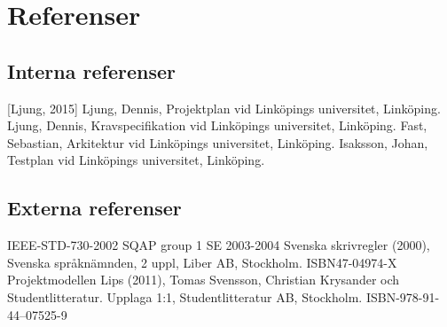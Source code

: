 \section{Referenser}


\subsection{Interna referenser}
[Ljung, 2015] Ljung, Dennis, Projektplan vid Linköpings universitet, Linköping.
\newline
\newline
[Ljung, 2015] Ljung, Dennis, Kravspecifikation vid Linköpings universitet, Linköping.
\newline
\newline
[Fast, 2015] Fast, Sebastian, Arkitektur vid Linköpings universitet, Linköping.
\newline
\newline
[Isaksson, 2015] Isaksson, Johan, Testplan vid Linköpings universitet, Linköping.

\subsection{Externa referenser}
IEEE-STD-730-2002 SQAP group 1 SE 2003-2004
\newline
\newline
Svenska skrivregler (2000), Svenska språknämnden, 2 uppl, Liber AB, Stockholm. ISBN47-04974-X
\newline
\newline
Projektmodellen Lips (2011), Tomas Svensson, Christian Krysander och Studentlitteratur. Upplaga 1:1, Studentlitteratur AB, Stockholm. ISBN-978-91-44--07525-9
